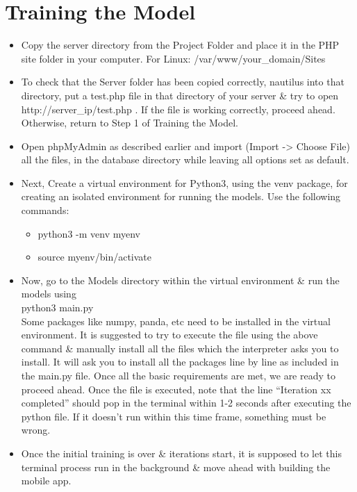 \documentclass[10pt]{report}
\begin{document}
\section{Training the Model}
\begin{itemize}
\item{Copy the server directory from the Project Folder and place it in the PHP site folder in your computer. For Linux: /var/www/your\_domain/Sites}
\item{To check that the Server folder has been copied correctly, nautilus into that directory, put a test.php file in that directory of your server \& try to open http://server\_ip/test.php . If the file is working correctly, proceed ahead. Otherwise, return to Step 1 of Training the Model.}
\item{Open phpMyAdmin as described earlier and import (Import -> Choose
File) all the files, in the database directory while leaving all options set as default.}
\item{Next, Create a virtual environment for Python3, using the venv
package, for creating an isolated environment for running the models. Use the following commands:}
\begin{itemize}
\item{python3 -m venv myenv}
\item{
source myenv/bin/activate}
\end{itemize}
\item{Now, go to the Models directory within the virtual environment \& run the models using \\ python3 main.py}
\\
Some packages like numpy, panda, etc need to be installed in the virtual environment. It is suggested to try to execute the file using the above command \& manually install all the files which the interpreter asks you to install. It will ask you to install all the packages line by line as included in the main.py file. Once all the basic requirements are met, we are ready to proceed ahead. Once the file is executed, note that the line “Iteration xx completed” should pop in the terminal within 1-2 seconds after executing the python file. If it doesn’t run within
this time frame, something must be wrong. 
\item{Once the initial training is over \& iterations start, it is supposed to let this terminal process run in the background \& move ahead with building the mobile app.}
\end{itemize}
\newpage
\end{document}
